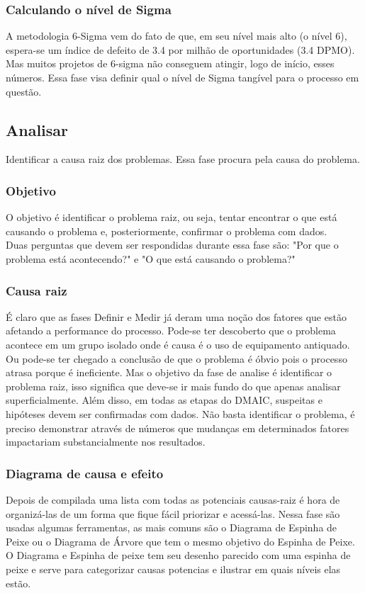 \documentclass{abnt}
\begin{document}
					\subsubsection {Calculando o nível de Sigma}
					A metodologia 6-Sigma vem do fato de que, em seu nível mais alto (o nível 6), espera-se um índice de 
					defeito de 3.4 por milhão de oportunidades (3.4 DPMO). Mas muitos projetos de 6-sigma não conseguem 
					atingir, logo de início, esses números. Essa fase visa definir qual o nível de Sigma tangível para o 
					processo em questão.
				\subsection {Analisar}
					Identificar a causa raiz dos problemas. Essa fase procura pela causa do problema.
					\subsubsection {Objetivo}
					O objetivo é identificar o problema raiz, ou seja, tentar encontrar o que está causando o problema 
					e, posteriormente, confirmar o problema com dados.\\
					Duas perguntas que devem ser respondidas durante essa fase são: "Por que o problema está acontecendo?" e 
					"O que está causando o problema?"
					\subsubsection {Causa raiz}
					É claro que as fases Definir e Medir já deram uma noção dos fatores que estão afetando a performance do processo. 
					Pode-se ter descoberto que o problema acontece em um grupo isolado onde é causa é o uso de equipamento antiquado. 
					Ou pode-se ter chegado a conclusão de que o problema é óbvio pois o processo atrasa porque é ineficiente. 
					Mas o objetivo da fase de analise é identificar o problema raiz, isso significa que deve-se ir mais fundo 
					do que apenas analisar superficialmente. Além disso, em todas as etapas do DMAIC, suspeitas e 
					hipóteses devem ser confirmadas com dados. Não basta identificar o problema, é preciso demonstrar através de números 
					que mudanças em determinados fatores impactariam substancialmente nos resultados.
					\subsubsection {Diagrama de causa e efeito}
					Depois de compilada uma lista com todas as potenciais causas-raiz é hora de organizá-las de um forma que fique 
					fácil priorizar e acessá-las.
					Nessa fase são usadas algumas ferramentas, as mais comuns são o Diagrama de Espinha de Peixe ou o Diagrama de Árvore 
					que tem o mesmo objetivo do Espinha de Peixe.\\
					O Diagrama e Espinha de peixe tem seu desenho parecido com uma espinha de peixe e serve para 
					categorizar causas potencias e ilustrar em quais níveis elas estão.
\end{document}

